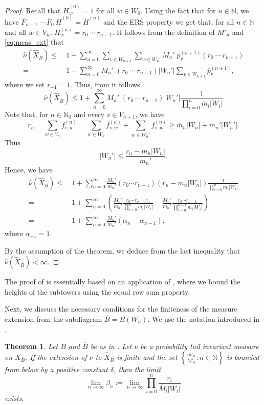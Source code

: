 \documentclass[11pt,reqno]{amsart}
\theoremstyle{definition}
\theoremstyle{remark}
\theoremstyle{plain}
\newtheorem{theorem}[definition]{Theorem}
\def\ol{\overline}
\def\ov{\overline}
\def\wh{\widehat}
\newcommand{\N}{\mathbb N}
\newcommand{\ba}{\begin{aligned}}
\newcommand{\ea}{\end{aligned}}
\numberwithin{equation}{section}
\begin{document}
\begin{proof} Recall that $\ov H_w^{(0)} = 1$ for all $w \in W_0$. Using the fact that for $n \in \N$, we have $\ov F_{n-1} \ \ \cdots \ov F_0\  \ov H^{(0)} = \ov H^{(n)}$ and the ERS property we get that, for all $n\in \N$ and all $w \in V_n$, $H_w^{(n)} = r_0 \ \cdots \ r_{n-1}$. It follows from the definition of $M'_n$ and \eqref{eq:meas_ext} that
\begin{align*}
    \wh \nu(\wh X_{\ov B}) \leq &\ 1 + \sum_{n = 0}^{\infty} \sum_{v \in W_{n+1}}\sum_{w \in W_n'} M_n'\;\ov p_v^{(n+1)}(r_0\ \cdots\ r_{n-1})\\
= &\ 1 + \sum_{n = 0}^{\infty} M_n'\; (r_0\ \cdots\ r_{n-1})|W_n'|\sum_{v \in W_{n+1}} \ov p_v^{(n+1)},
\end{align*}
where we set $r_{-1} = 1.$
Thus, from  it follows
\[
\wh \nu(\wh X_{\ov B}) \leq 1 + \sum_{n = 0}^{\infty} M_n'\; (r_0\ \cdots\ r_{n-1})|W_n'| \frac{1}{\prod_{i = 0}^n\ov m_i|W_i|}
\] 
Note that, for $n \in \N_0$ and every $v \in V_{n+1}$, we have
$$
r_n = \sum_{w \in V_n} f_{v,w}^{(n)} = \sum_{w \in W_n} f_{v,w}^{(n)} + \sum_{w \in W_n'} f_{v,w}^{(n)} \geq \ov m_n |W_n| + m_n'|W_n'|.
$$
Thus
$$
|W_n'| \leq \frac{r_n - \ov m_n|W_n|}{m_n'}. 
$$
Hence, we have
$$
\ba
\wh \nu(\wh X_{\ov B}) \leq &\ 1 +  \sum_{n = 0}^{\infty} \frac{M_n'}{m_n'}(r_0 \cdots r_{n-1})(r_n - \ov m_n |W_n|)\frac{1}{\prod_{i = 0}^n\ov m_i |W_i|}\\
=&\ 1 + \sum_{n = 0}^{\infty} \left(\frac{M_n'}{m_n'}\frac{r_0 \cdots r_{n-1}r_n}{\prod_{i = 0}^n\ov m_i |W_i|} - \frac{M_n'}{m_n'}\frac{r_0 \cdots r_{n-1}}{\prod_{i = 0}^{n-1}\ov m_i |W_i|}\right) \\ 
= & \ 1 + \sum_{n = 0}^{\infty}\frac{M_n'}{m_n'} (\alpha_n - 
\alpha_{n-1}),
\ea
$$ 
where $\alpha_{-1} =1$.

By the assumption of the theorem, we deduce from the last inequality that 
$\wh \nu(\wh X_{\ov B}) < \infty$.
\end{proof}

The proof of  is essentially based on an application of , where we bound the heights of the subtowers using the equal row sum property.

Next, we discuss the necessary conditions for the finiteness of the measure extension from the subdiagram $\ol B = B(W_n)$. We use the notation introduced in . 

\begin{theorem}\label{thm ness cond finite sbdgrm} 
Let $B$ and $\ol B$ be as in .
Let $\nu$ be a probability tail invariant measure on $X_{\ol B}$.
If the extension of $\nu$ to $\wh X_{\ol B}$ is finite and the set 
$\left\{\frac{m'_n}{M'_n} : n \in \N\right\}$ is bounded from below by a positive constant $\delta$, then the limit 
$$
\lim_{n\to \infty} \beta_n := \lim_{n\to \infty} 
  \prod_{i = 0}^n \frac{r_i}{\ov M_i |W_i|}
$$
exists. 
\end{theorem}
\end{document}
